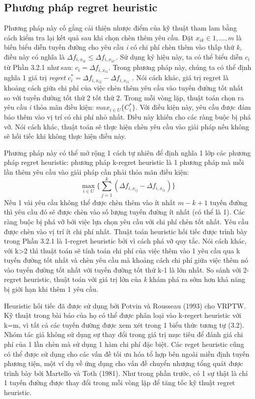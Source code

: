 \subsection{Phương pháp regret heuristic}
Phương pháp này cố gắng cải thiện nhược điểm của kỹ thuật tham lam bằng cách kiểm tra lại kết quả sau khi chọn chèn thêm yêu cầu. Đặt $x_{ik} \in {1, ..., m}$ là biến biểu diễn tuyến đường cho yêu cầu \textit{i} có chi phí chèn thêm vào thấp thứ \textit{k}, điều này có nghĩa là $\Delta f_{i, x_{ik}} \leqslant \Delta f_{i, x_{ik'}}$. Sử dụng ký hiệu này, ta có thể biểu diễn $c_i$ từ Phần 3.2.1 như sau: $c_i = \Delta f_{i, x_{i1}}$. Trong phương pháp này, chúng ta có thể định nghĩa 1 giá trị \textit{regret} $c_i^* = \Delta f_{i, x_{i2}} - \Delta f_{i, x_{i1}}$ . Nói cách khác, giá trị regret là khoảng cách giữa chi phí của việc chèn thêm yêu cầu vào tuyến đường tốt nhất so với tuyến đường tốt thứ 2 tốt thứ 2. Trong mỗi vòng lặp, thuật toán chọn ra yêu cầu \textit{i} thỏa mãn điều kiện: $max_{i \in U} \{C_i^*\}$. Với điều kiện này, yêu cầu được đảm bảo thêm vào vị trí có chi phí nhỏ nhất. Điều này khiến cho các ràng buộc bị phá vỡ. Nói cách khác, thuật toán sẽ thực hiện chèn yêu cầu vào giải pháp nếu không sẽ hối tiếc khi không thực hiện điều này.

Phương pháp này có thể mở rộng 1 cách tự nhiên để định nghĩa 1 lớp các phương pháp regret heuristic: phương pháp k-regret heuristic là 1 phương pháp mà mỗi lần thêm yêu cầu vào giải pháp cần phải thỏa mãn điều kiện:
\begin{equation}
    \max\limits_{i \in U} \{ \sum_{j=1}^k (\Delta f_{i, x_{ij}} - \Delta f_{i, x_{i1}}) \}
\end{equation}
Nếu 1 vài yêu cầu không thể được chèn thêm vào ít nhất $m-k+1$ tuyến đường thì yêu cầu đó sẽ được chèn vào số lượng tuyến đường ít nhất (có thể là 1). Các ràng buộc bị phá vỡ bởi việc lựa chọn yêu cầu với chi phí chèn tốt nhất. Yêu cầu được chèn vào vị trí ít chi phí nhất. Thuật toán heuristic hối tiếc được trình bày trong Phần 3.2.1 là 1-regret heuristic bởi vì cách phá vỡ quy tắc. Nói cách khác, với k>2 thì thuật toán sẽ tính toán chi phí của việc thêm vào 1 yêu cầu qua k tuyến đường tốt nhất và chèn yêu cầu mà khoảng cách chi phí giữa việc thêm nó vào tuyến đường tốt nhất với tuyến đường tốt thứ k-1 là lớn nhất. So sánh với 2-regret heuristic, thuật toán với giá trị lớn của \textit{k} khám phá ra sớm hơn khả năng bị giới hạn khi thêm 1 yêu cầu.

Heuristic hối tiếc đã được sử dụng bởi Potvin và Rousseau (1993) cho VRPTW. Kỹ thuật trong bài báo của họ có thể được phân loại vào k-regert heuristic với k=m, vì tất cả các tuyến đường được xem xét trong 1 biểu thức tương tự (3.2). Nhóm tác giả không sử dụng sự thay đổi trong giá trị mục tiêu để đánh giá chi phí của 1 lần chèn mà sử dụng 1 hàm chi phí đặc biệt. Các reget heuristic cũng có thể được sử dụng cho các vấn đề tối ưu hóa tổ hợp bên ngoài miền định tuyến phương tiện, một ví dụ về ứng dụng cho vấn đề chuyển nhượng tổng quát được trình bày bởi Martello và Toth (1981). Như trong phần trước, có 1 sự thật là chỉ 1 tuyến đường được thay đổi trong mỗi vòng lặp để tăng tốc kỹ thuật regret heuristic.